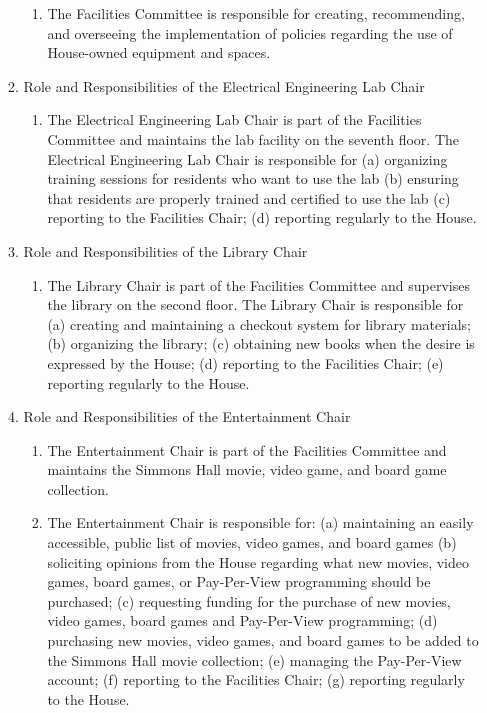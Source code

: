 \documentclass[letterpaper]{article}
\begin{document}
\begin{enumerate}
\begin{enumerate}
\begin{enumerate}
\item The Facilities Committee is responsible for creating, recommending, and overseeing the implementation of policies regarding the use of House-owned equipment and spaces.

\end{enumerate}

\item Role and Responsibilities of the Electrical Engineering Lab Chair

\begin{enumerate}

\item The Electrical Engineering Lab Chair is part of the Facilities Committee and maintains the lab facility on the seventh floor. The Electrical Engineering Lab Chair is responsible for (a) organizing training sessions for residents who want to use the lab (b) ensuring that residents are properly trained and certified to use the lab (c) reporting to the Facilities Chair; (d) reporting regularly to the House.

\end{enumerate}

\item Role and Responsibilities of the Library Chair

\begin{enumerate}

\item The Library Chair is part of the Facilities Committee and supervises the library on the second floor. The Library Chair is responsible for (a) creating and maintaining a checkout system for library materials; (b) organizing the library; (c) obtaining new books when the desire is expressed by the House; (d) reporting to the Facilities Chair; (e) reporting regularly to the House.

\end{enumerate}

\item Role and Responsibilities of the Entertainment Chair 

\begin{enumerate}

\item The Entertainment Chair is part of the Facilities Committee and maintains the Simmons Hall movie, video game, and board game collection.

\item The Entertainment Chair is responsible for: (a) maintaining an easily accessible, public list of movies, video games, and board games (b) soliciting opinions from the House regarding what new movies, video games, board games, or Pay-Per-View programming should be purchased; (c) requesting funding for the purchase of new movies, video games, board games and Pay-Per-View programming; (d) purchasing new movies, video games, and board games to be added to the Simmons Hall movie collection; (e) managing the Pay-Per-View account; (f) reporting to the Facilities Chair; (g) reporting regularly to the House.


\end{enumerate}
\end{enumerate}
\end{enumerate}
\end{document}
